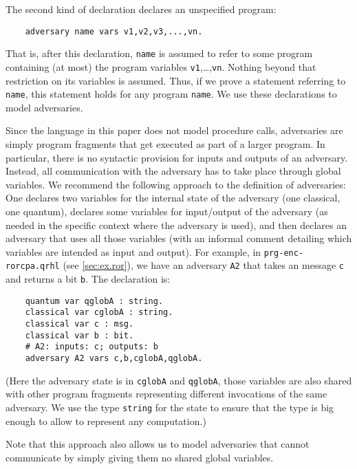 \documentclass{article}
\makeatletter
\newcommand\toolidx[1]{\index{#1@\textttOLD{#1} (tool command)}}
\makeatother
\begin{document}
The second kind of declaration declares an unspecified program:
\begin{center}
  \toolidx{adversary}
  \begin{lstlisting}
    adversary name vars v1,v2,v3,...,vn.
  \end{lstlisting}
\end{center}
That is, after this declaration, \texttt{name} is assumed to refer to
some program containing (at most) the program variables
\texttt{v1},\dots,\texttt{vn}. Nothing beyond that restriction on its
variables is assumed. Thus, if we prove a statement referring to
\texttt{name}, this statement holds for any program \texttt{name}. We
use these declarations to model adversaries.

Since the language in this paper does not model procedure calls,
adversaries are simply program fragments that get executed as part of
a larger program. In particular, there is no syntactic provision for
inputs and outputs of an adversary. Instead, all communication with
the adversary has to take place through global variables. We recommend
the following approach to the definition of adversaries: One declares
two variables for the internal state of the adversary (one classical,
one quantum), declares some variables for input/output of the
adversary (as needed in the specific context where the adversary is
used), and then declares an adversary that uses all those variables
(with an informal comment detailing which variables are intended as input and
output). For example, in \texttt{prg-enc-rorcpa.qrhl} (see \autoref{sec:ex.ror}), we have an
adversary \texttt{A2} that takes an message \texttt{c} and returns
a bit \texttt{b}. The declaration is:
\begin{center}
  \begin{lstlisting}
    quantum var qglobA : string.
    classical var cglobA : string.
    classical var c : msg.
    classical var b : bit.
    # A2: inputs: c; outputs: b
    adversary A2 vars c,b,cglobA,qglobA.
  \end{lstlisting}
\end{center}
(Here the adversary state is in \texttt{cglobA} and \texttt{qglobA},
those variables are also shared with other program fragments
representing different invocations of the same adversary. We use the
type \texttt{string} for the state to ensure that the type is big enough to allow to represent any computation.)

Note that this approach also allows us to model adversaries that
cannot communicate by simply giving them no shared global variables.
\end{document}
